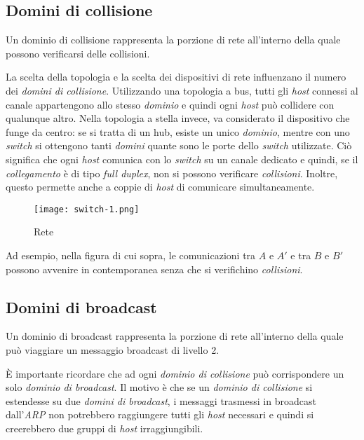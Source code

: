 \subsection{Domini di collisione}
\begin{definition}
    Un dominio di collisione rappresenta la porzione di rete all'interno della
    quale possono verificarsi delle collisioni.
\end{definition}\noindent
La scelta della topologia e la scelta dei dispositivi di rete influenzano il
numero dei \emph{domini di collisione}. Utilizzando una topologia a bus, tutti
gli \emph{host} connessi al canale appartengono allo stesso \emph{dominio} e quindi
ogni \emph{host} può collidere con qualunque altro. Nella topologia a stella
invece, va considerato il dispositivo che funge da centro: se si tratta di un
hub, esiste un unico \emph{dominio}, mentre con uno \emph{switch} si ottengono
tanti \emph{domini} quante sono le porte dello \emph{switch} utilizzate.
Ciò significa che ogni \emph{host} comunica con lo \emph{switch} su un canale
dedicato e quindi, se il \emph{collegamento} è di tipo \emph{full duplex}, non
si possono verificare \emph{collisioni}. Inoltre, questo permette anche
a coppie di \emph{host} di comunicare simultaneamente.

\begin{figure}[h!]
    \centering
    \texttt{[image: switch-1.png]}
    \caption{Rete }
\end{figure}\noindent
Ad esempio, nella figura di cui sopra, le comunicazioni tra $A$ e $A'$ e tra
$B$ e $B'$ possono avvenire in contemporanea senza che si verifichino
\emph{collisioni}.

\subsection{Domini di broadcast}
\begin{definition}
    Un dominio di broadcast rappresenta la porzione di rete all'interno della
    quale può viaggiare un messaggio broadcast di livello 2.
\end{definition}\noindent
È importante ricordare che ad ogni \emph{dominio di collisione} può corrispondere
un solo \emph{dominio di broadcast}. Il motivo è che se un \emph{dominio di
collisione} si estendesse su due \emph{domini di broadcast}, i messaggi
trasmessi in broadcast dall'\emph{ARP} non potrebbero raggiungere tutti gli
\emph{host} necessari e quindi si creerebbero due gruppi di \emph{host}
irraggiungibili.

